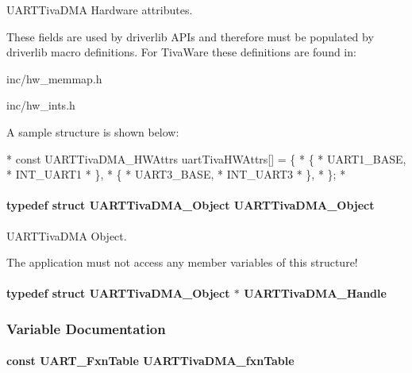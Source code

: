 U\-A\-R\-T\-Tiva\-D\-M\-A Hardware attributes. 

These fields are used by driverlib A\-P\-Is and therefore must be populated by driverlib macro definitions. For Tiva\-Ware these definitions are found in\-:
\begin{DoxyItemize}
\item inc/hw\-\_\-memmap.\-h
\item inc/hw\-\_\-ints.\-h
\end{DoxyItemize}

A sample structure is shown below\-: 
\begin{DoxyCode}
*  \textcolor{keyword}{const} UARTTivaDMA_HWAttrs uartTivaHWAttrs[] = \{
*      \{
*          UART1\_BASE,
*          INT\_UART1
*      \},
*      \{
*          UART3\_BASE,
*          INT\_UART3
*      \},
*  \};
*  
\end{DoxyCode}
\paragraph[{U\-A\-R\-T\-Tiva\-D\-M\-A\-\_\-\-Object}]{\setlength{\rightskip}{0pt plus 5cm}typedef struct {\bf U\-A\-R\-T\-Tiva\-D\-M\-A\-\_\-\-Object}  {\bf U\-A\-R\-T\-Tiva\-D\-M\-A\-\_\-\-Object}}\label{_u_a_r_t_tiva_d_m_a_8h_ae68f92de73a22b2cdb1359930e949fc4}


U\-A\-R\-T\-Tiva\-D\-M\-A Object. 

The application must not access any member variables of this structure! 
\paragraph[{U\-A\-R\-T\-Tiva\-D\-M\-A\-\_\-\-Handle}]{\setlength{\rightskip}{0pt plus 5cm}typedef struct {\bf U\-A\-R\-T\-Tiva\-D\-M\-A\-\_\-\-Object} $\ast$ {\bf U\-A\-R\-T\-Tiva\-D\-M\-A\-\_\-\-Handle}}\label{_u_a_r_t_tiva_d_m_a_8h_ad1591b2fa5d54f24f2acf1920788b015}


\subsubsection{Variable Documentation}
\paragraph[{U\-A\-R\-T\-Tiva\-D\-M\-A\-\_\-fxn\-Table}]{\setlength{\rightskip}{0pt plus 5cm}const {\bf U\-A\-R\-T\-\_\-\-Fxn\-Table} U\-A\-R\-T\-Tiva\-D\-M\-A\-\_\-fxn\-Table}\label{_u_a_r_t_tiva_d_m_a_8h_a05f21c1bf87357c509b7fca956223141}
